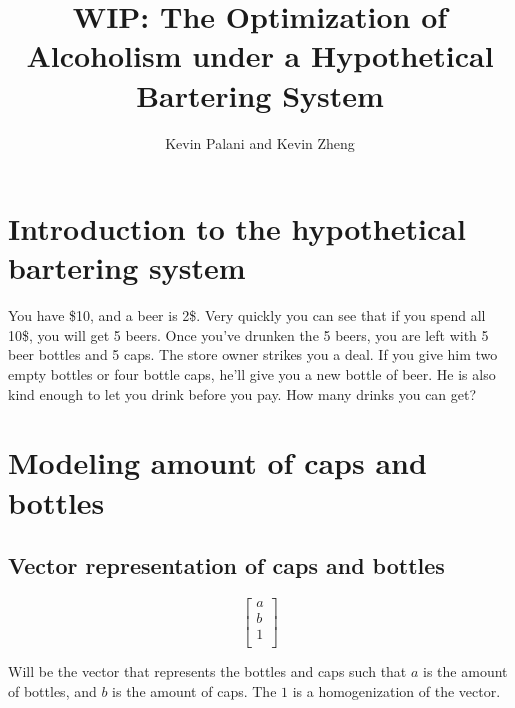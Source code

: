\documentclass[letterpaper, 12pt]{article}
\title{WIP: The Optimization of Alcoholism under a Hypothetical Bartering System}
\author{Kevin Palani and Kevin Zheng}
\begin{document}
\maketitle
\tableofcontents
\section{Introduction to the hypothetical bartering system}
\par You have \$10, and a beer is 2\$.
Very quickly you can see that if you spend all 10\$, you will get 5 beers.
Once you've drunken the 5 beers, you are left with 5 beer bottles and 5 caps.
The store owner strikes you a deal.
If you give him two empty bottles or four bottle caps, he'll give you a new bottle of beer.
He is also kind enough to let you drink before you pay.
How many drinks you can get?
\section{Modeling amount of caps and bottles}
\subsection{Vector representation of caps and bottles}
\[
    \begin{bmatrix}
        a\\
        b\\
        1\\
    \end{bmatrix}
\]
\par Will be the vector that represents the bottles and caps such that $a$ is the amount of bottles, and $b$ is the amount of caps.
The $1$ is a homogenization of the vector.
\end{document}
